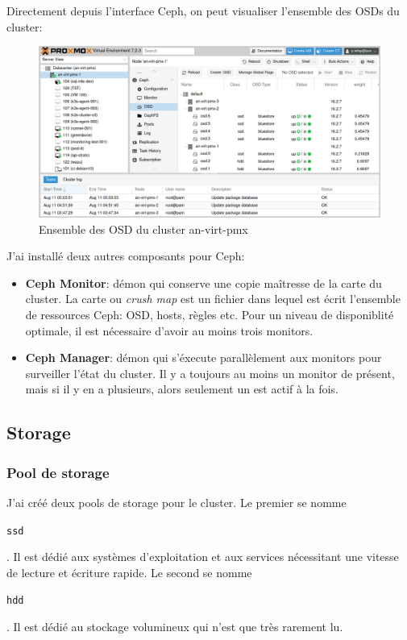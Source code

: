 \documentclass[12pt]{article}
\begin{document}
Directement depuis l'interface \gls{Ceph}, on peut visualiser l'ensemble des \gls{OSD}s du \gls{cluster}:
\begin{figure}[ht!]
    \centering
        \includegraphics[width=\textwidth]{src/interface_proxmox_osd.png}
    \caption{Ensemble des \gls{OSD} du \gls{cluster} an-virt-pmx}
    \label{fig:osd_cluster}
\end{figure}

\newpage
J'ai installé deux autres composants pour \gls{Ceph}:
\begin{itemize}
    \item \textbf{\gls{Ceph} Monitor}: démon qui conserve une copie maîtresse de la carte du \gls{cluster}. 
    La carte ou \textit{crush map} est un fichier dans lequel est écrit l'ensemble de ressources \gls{Ceph}: \gls{OSD}, hosts, règles etc.
    Pour un niveau de disponiblité optimale, il est nécessaire d'avoir au moins trois monitors.
    \item \textbf{\gls{Ceph} Manager}: démon qui s'éxecute parallèlement aux monitors pour surveiller l'état du \gls{cluster}.
    Il y a toujours au moins un monitor de présent, mais si il y en a plusieurs, alors seulement un est actif à la fois.
\end{itemize}

\subsection{Storage}
\subsubsection{Pool de storage}
J'ai créé deux pools de storage pour le \gls{cluster}.
Le premier se nomme \begin{code}\texttt{ssd}\end{code}. 
Il est dédié aux systèmes d'exploitation et aux services nécessitant une vitesse de lecture et écriture rapide.
Le second se nomme \begin{code}\texttt{hdd}\end{code}.
Il est dédié au stockage volumineux qui n'est que très rarement lu.
\end{document}
